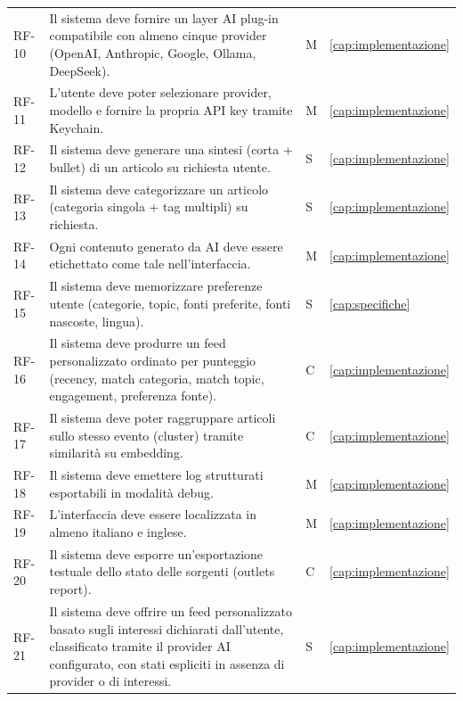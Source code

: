 \begin{table}[h]
\begin{tabular}{p{1.2cm}p{10cm}p{1cm}p{1.5cm}}
RF-10 & Il sistema deve fornire un layer AI plug-in compatibile con almeno cinque provider (OpenAI, Anthropic, Google, Ollama, DeepSeek). & M & \ref{cap:implementazione} \\
RF-11 & L'utente deve poter selezionare provider, modello e fornire la propria API key tramite Keychain. & M & \ref{cap:implementazione} \\
RF-12 & Il sistema deve generare una sintesi (corta + bullet) di un articolo su richiesta utente. & S & \ref{cap:implementazione} \\
RF-13 & Il sistema deve categorizzare un articolo (categoria singola + tag multipli) su richiesta. & S & \ref{cap:implementazione} \\
RF-14 & Ogni contenuto generato da AI deve essere etichettato come tale nell'interfaccia. & M & \ref{cap:implementazione} \\
RF-15 & Il sistema deve memorizzare preferenze utente (categorie, topic, fonti preferite, fonti nascoste, lingua). & S & \ref{cap:specifiche} \\
RF-16 & Il sistema deve produrre un feed personalizzato ordinato per punteggio (recency, match categoria, match topic, engagement, preferenza fonte). & C & \ref{cap:implementazione} \\
RF-17 & Il sistema deve poter raggruppare articoli sullo stesso evento (cluster) tramite similarità su embedding. & C & \ref{cap:implementazione} \\
RF-18 & Il sistema deve emettere log strutturati esportabili in modalità debug. & M & \ref{cap:implementazione} \\
RF-19 & L'interfaccia deve essere localizzata in almeno italiano e inglese. & M & \ref{cap:implementazione} \\
RF-20 & Il sistema deve esporre un'esportazione testuale dello stato delle sorgenti (outlets report). & C & \ref{cap:implementazione} \\
RF-21 & Il sistema deve offrire un feed personalizzato basato sugli interessi dichiarati dall'utente, classificato tramite il provider AI configurato, con stati espliciti in assenza di provider o di interessi. & S & \ref{cap:implementazione} \\
\bottomrule
\end{tabular}
\end{table}

